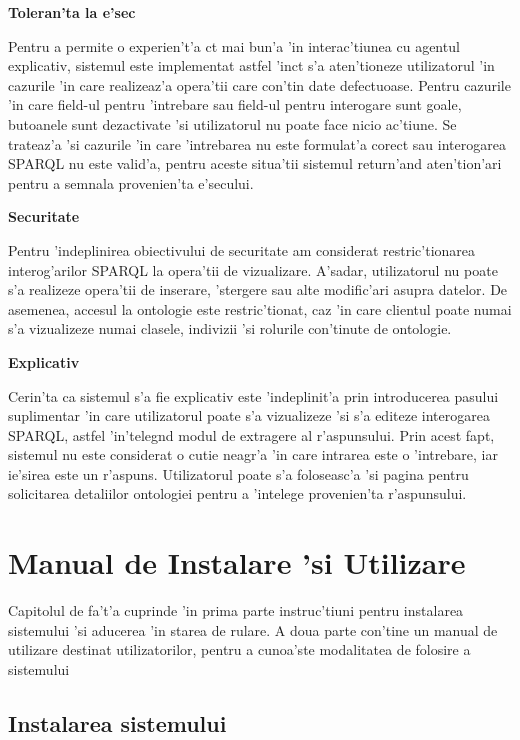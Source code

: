 \documentclass[12pt,a4paper,twoside]{report}
\begin{document}
{\bf Toleran'ta la e'sec}

Pentru a permite o experien't'a c\ia t mai bun'a 'in interac'tiunea cu agentul explicativ, sistemul este implementat astfel 'inc\ia t s'a aten'tioneze utilizatorul 'in cazurile 'in care realizeaz'a opera'tii care con'tin date defectuoase. Pentru cazurile 'in care field-ul pentru 'intrebare sau field-ul pentru interogare sunt goale, butoanele sunt dezactivate 'si utilizatorul nu poate face nicio ac'tiune. Se trateaz'a 'si cazurile 'in care 'intrebarea nu este formulat'a corect sau interogarea SPARQL nu este valid'a, pentru aceste situa'tii sistemul return'and aten'tion'ari pentru a semnala provenien'ta e'secului.

{\bf Securitate}

Pentru 'indeplinirea obiectivului de securitate am considerat restric'tionarea interog'arilor SPARQL la opera'tii de vizualizare. A'sadar, utilizatorul nu poate s'a realizeze opera'tii de inserare, 'stergere sau alte modific'ari asupra datelor. De asemenea, accesul la ontologie este restric'tionat, caz 'in care clientul poate numai s'a vizualizeze numai clasele, indivizii 'si rolurile con'tinute de ontologie.  

{\bf Explicativ}

Cerin'ta ca sistemul s'a fie explicativ este 'indeplinit'a prin introducerea pasului suplimentar 'in care utilizatorul poate s'a vizualizeze 'si s'a editeze interogarea SPARQL, astfel 'in'teleg\ia nd modul de extragere al r'aspunsului. Prin acest fapt, sistemul nu este considerat o cutie neagr'a 'in care intrarea este o 'intrebare, iar ie'sirea este un r'aspuns. Utilizatorul poate s'a foloseasc'a 'si pagina pentru solicitarea detaliilor ontologiei pentru a 'intelege provenien'ta r'aspunsului.

\chapter{Manual de Instalare 'si Utilizare}

Capitolul de fa't'a cuprinde 'in prima parte instruc'tiuni pentru instalarea sistemului 'si aducerea 'in starea de rulare. A doua parte con'tine un manual de utilizare destinat utilizatorilor, pentru a cunoa'ste modalitatea de folosire a sistemului

\section{Instalarea sistemului}
\end{document}
